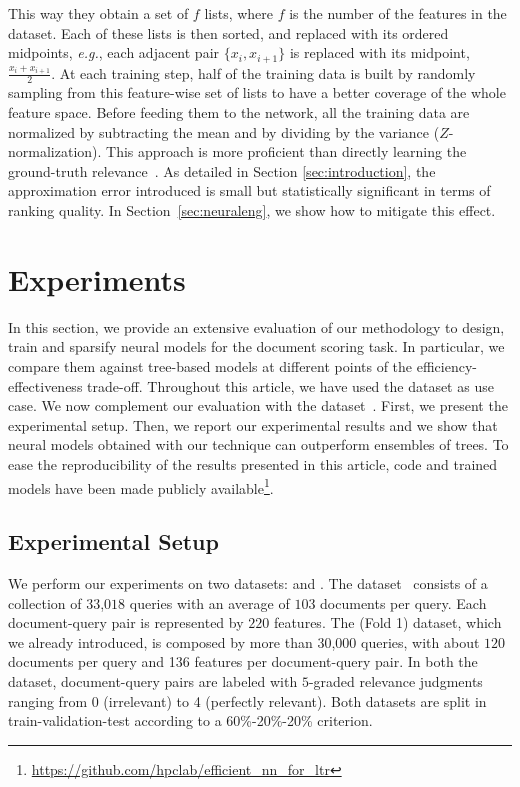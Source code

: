 This way they obtain a set of $f$ lists, where $f$ is the number of the features in the dataset. Each of these lists is then sorted, and replaced with its ordered midpoints, \emph{e.g.}, each adjacent pair $\{x_i, x_{i+1}\}$ is replaced with its midpoint, $\frac{x_i + x_{i+1}}{2}$.  At each training step, half of the training data is built by randomly sampling from this feature-wise set of lists to have a better coverage of the whole feature space. Before feeding them to the network, all the training data are normalized by subtracting the mean and by dividing by the variance ($Z$-normalization).
This approach is more proficient than directly learning the ground-truth relevance~\cite{cohen2018universal}. As detailed in Section \ref{sec:introduction}, the approximation error introduced is small but statistically significant in terms of ranking quality. In Section~\ref{sec:neuraleng}, we show how to mitigate this effect.


\section{Experiments}
\label{sec:experiments}
In this section, we provide an extensive evaluation of our methodology to design, train and sparsify neural models for the document scoring task. In particular, we compare them against tree-based models at different points of the efficiency-effectiveness trade-off. Throughout this article, we have used the \msn dataset as use case. We now complement our evaluation with the \istella dataset~\cite{dato2016fast}. 
First, we present the experimental setup. Then, we report our experimental results and we show that neural models obtained with our technique can outperform ensembles of trees. To ease the reproducibility of the results presented in this article, code and trained models have been made publicly available\footnote{\url{https://github.com/hpclab/efficient_nn_for_ltr}}.


\vspace{-.3cm}
\subsection{Experimental Setup}
\label{subsec:expsetup}
We perform our experiments on two datasets: \istella and \msn. The \istella dataset~\cite{dato2016fast} consists of a collection of $33$,$018$ queries with an average of $103$ documents per query. Each document-query pair is represented by $220$ features. The \msn (Fold 1) dataset, which we already introduced, is composed by more than $30$,$000$ queries, with about $120$ documents per query and 136 features per document-query pair. In both the dataset, document-query pairs are labeled with $5$-graded relevance judgments ranging from 0 (irrelevant) to 4 (perfectly relevant).
Both datasets are split in train-validation-test according to a 60\%-20\%-20\% criterion. 

